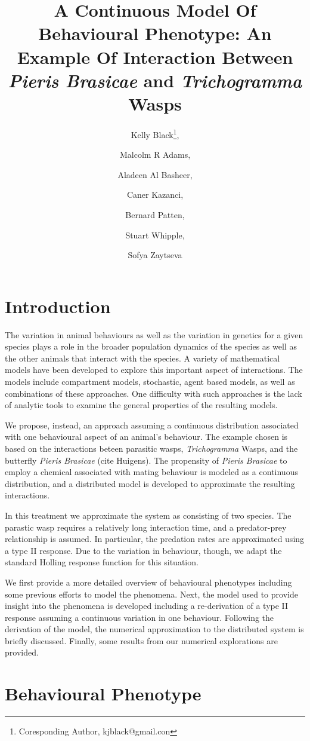 \documentclass[12pt]{article}
\title{A Continuous Model Of Behavioural Phenotype: An Example Of
  Interaction Between \textit{Pieris Brasicae} and
  \textit{Trichogramma} Wasps}
\author{Kelly Black\thanks{Coresponding Author, kjblack@gmail.con},
  \and Malcolm R Adams, \and Aladeen Al Basheer, \and Caner Kazanci,
  \and Bernard Patten, \and Stuart Whipple, \and Sofya Zaytseva}
\begin{document}
\maketitle

\section{Introduction}

The variation in animal behaviours as well as the variation in
genetics for a given species plays a role in the broader population
dynamics of the species as well as the other animals that interact
with the species. A variety of mathematical models have been developed
to explore this important aspect of interactions. The models include
compartment models, stochastic, agent based models, as well as
combinations of these approaches. One difficulty with such approaches
is the lack of analytic tools to examine the general properties of the
resulting models.

We propose, instead, an approach assuming a continuous distribution
associated with one behavioural aspect of an animal's behaviour. The
example chosen is based on the interactions beteen parasitic wasps,
\textit{Trichogramma} Wasps, and the butterfly \textit{Pieris
  Brasicae} (cite Huigens).  The propensity of \textit{Pieris
  Brasicae} to employ a chemical associated with mating behaviour is
modeled as a continuous distribution, and a distributed model is
developed to approximate the resulting interactions.

In this treatment we approximate the system as consisting of two
species. The parastic wasp requires a relatively long interaction
time, and a predator-prey relationship is assumed. In particular, the
predation rates are approximated using a type II response. Due to the
variation in behaviour, though, we adapt the standard Holling response
function for this situation.

We first provide a more detailed overview of behavioural phenotypes
including some previous efforts to model the phenomena. Next, the
model used to provide insight into the phenomena is developed
including a re-derivation of a type II response assuming a continuous
variation in one behaviour. Following the derivation of the model, the
numerical approximation to the distributed system is briefly
discussed. Finally, some results from our numerical explorations are
provided.

\section{Behavioural Phenotype}
\end{document}
